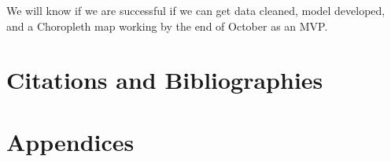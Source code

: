 \documentclass[sigconf,nonacm,11pt]{acmart}
\begin{document}
We will know if we are successful if we can get data cleaned, model developed, and a Choropleth map working by the end of October as an MVP.


\section{Citations and Bibliographies}

\section{Appendices}





\appendix




\end{document}
